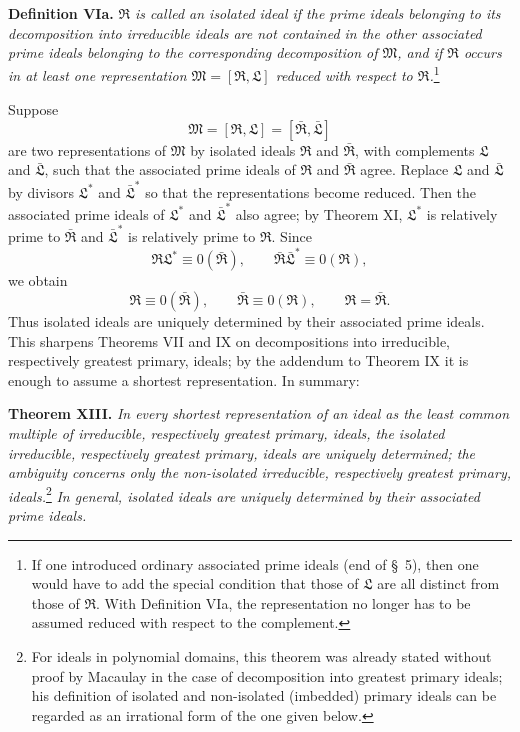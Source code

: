 \documentclass[11pt]{article}
\newcommand{\ideal}[1]{\mathfrak{#1}}
\begin{document}
\textbf{Definition VIa.} \emph{$\ideal R$ is called an isolated ideal if the prime ideals belonging to its decomposition into irreducible ideals are not contained in the other associated prime ideals belonging to the corresponding decomposition of $\ideal M$, and if $\ideal R$ occurs in at least one representation $\ideal M=[\ideal R,
\ideal L]$ reduced with respect to $\ideal R$.}\footnote{If one introduced ordinary associated prime ideals (end of \S~5), then one would have to add the special condition that those of $\ideal L$ are all distinct from those of $\ideal R$. With Definition VIa, the representation no longer has to be assumed reduced with respect to the complement.}

Suppose
\[
 \ideal M=[\ideal R,
\ideal L]=[\bar{\ideal R},
\bar{\ideal L}]
\]
are two representations of $\ideal M$ by isolated ideals $\ideal R$ and $\bar{\ideal R}$, with complements $\ideal L$ and $\bar{\ideal L}$, such that the associated prime ideals of $\ideal R$ and $\bar{\ideal R}$ agree. Replace $\ideal L$ and $\bar{\ideal L}$ by divisors $\ideal L^*$ and $\bar{\ideal L}^{*}$ so that the representations become reduced. Then the associated prime ideals of $\ideal L^*$ and $\bar{\ideal L}^{*}$ also agree; by Theorem XI, $\ideal L^*$ is relatively prime to $\bar{\ideal R}$ and $\bar{\ideal L}^{*}$ is relatively prime to $\ideal R$. Since
\[
 \ideal R\ideal L^*\equiv0(\bar{\ideal R}),
 \qquad
 \bar{\ideal R}\bar{\ideal L}^{*}\equiv0(\ideal R),
\]
we obtain
\[
 \ideal R\equiv0(\bar{\ideal R}),
 \qquad
 \bar{\ideal R}\equiv0(\ideal R),
 \qquad
 \ideal R=\bar{\ideal R}.
\]
Thus isolated ideals are uniquely determined by their associated prime ideals. This sharpens Theorems VII and IX on decompositions into irreducible, respectively greatest primary, ideals; by the addendum to Theorem IX it is enough to assume a shortest representation. In summary:

\textbf{Theorem XIII.} \emph{In every shortest representation of an ideal as the least common multiple of irreducible, respectively greatest primary, ideals, the isolated irreducible, respectively greatest primary, ideals are uniquely determined; the ambiguity concerns only the non-isolated irreducible, respectively greatest primary, ideals.}\footnote{For ideals in polynomial domains, this theorem was already stated without proof by Macaulay in the case of decomposition into greatest primary ideals; his definition of isolated and non-isolated (imbedded) primary ideals can be regarded as an irrational form of the one given below.} \emph{In general, isolated ideals are uniquely determined by their associated prime ideals.}
\end{document}
